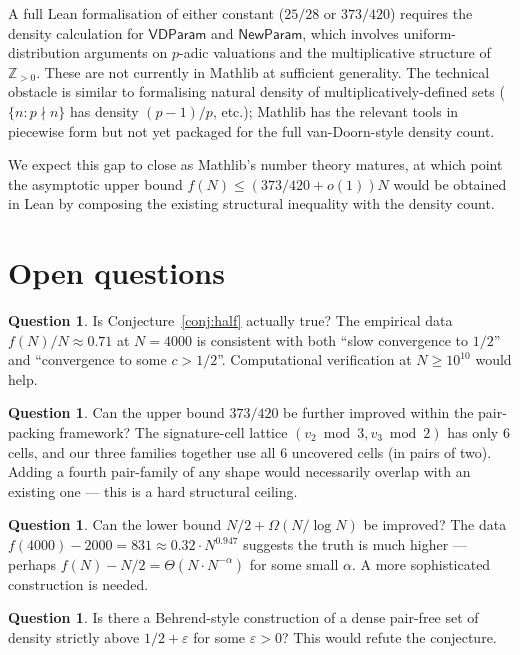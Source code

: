 \documentclass[11pt]{amsart}
\theoremstyle{plain}
\theoremstyle{definition}
\newtheorem{question}[theorem]{Question}
\newcommand{\Z}{\mathbb{Z}}
\newcommand{\vdp}{\mathsf{VDParam}}
\newcommand{\np}{\mathsf{NewParam}}
\begin{document}
A full Lean formalisation of either constant ($25/28$ or $373/420$) requires the density calculation for $\vdp$ and $\np$, which involves uniform-distribution arguments on $p$-adic valuations and the multiplicative structure of $\Z_{>0}$. These are not currently in Mathlib at sufficient generality. The technical obstacle is similar to formalising natural density of multiplicatively-defined sets ($\{n : p \nmid n\}$ has density $(p-1)/p$, etc.); Mathlib has the relevant tools in piecewise form but not yet packaged for the full van-Doorn-style density count.

We expect this gap to close as Mathlib's number theory matures, at which point the asymptotic upper bound $f(N) \leq (373/420 + o(1)) N$ would be obtained in Lean by composing the existing structural inequality with the density count.

\section{Open questions}\label{sec:open}

\begin{question}
Is Conjecture~\ref{conj:half} actually true? The empirical data $f(N)/N \approx 0.71$ at $N = 4000$ is consistent with both ``slow convergence to $1/2$'' and ``convergence to some $c > 1/2$''. Computational verification at $N \geq 10^{10}$ would help.
\end{question}

\begin{question}
Can the upper bound $373/420$ be further improved within the pair-packing framework? The signature-cell lattice $(v_2 \bmod 3, v_3 \bmod 2)$ has only $6$ cells, and our three families together use all $6$ uncovered cells (in pairs of two). Adding a fourth pair-family of any shape would necessarily overlap with an existing one --- this is a hard structural ceiling.
\end{question}

\begin{question}
Can the lower bound $N/2 + \Omega(N/\log N)$ be improved? The data $f(4000) - 2000 = 831 \approx 0.32 \cdot N^{0.947}$ suggests the truth is much higher --- perhaps $f(N) - N/2 = \Theta(N \cdot N^{-\alpha})$ for some small $\alpha$. A more sophisticated construction is needed.
\end{question}

\begin{question}
Is there a Behrend-style construction of a dense pair-free set of density strictly above $1/2 + \varepsilon$ for some $\varepsilon > 0$? This would refute the conjecture.
\end{question}
\end{document}
